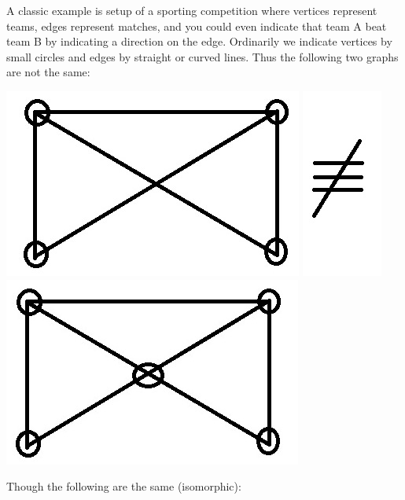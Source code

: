 \documentclass[12pt, letterpaper, onecolumn, conference, final]{IEEEtran}
\theoremstyle{definition}
\theoremstyle{plain}
\begin{document}
\noindent
A classic example is setup of a sporting competition where vertices represent teams, edges represent matches, and you could even indicate that team A beat team B by indicating a direction on the edge. Ordinarily we indicate vertices by small circles and edges by straight or curved lines. Thus the following two graphs are not the same:
\begin{center}
\includegraphics[scale=.3]{Graph1_1.jpg} \includegraphics[scale=.3]{Not_Equal.jpg} \includegraphics[scale=.3]{Graph1_2.jpg}
\end{center}
Though the following are the same (isomorphic):
\end{document}
